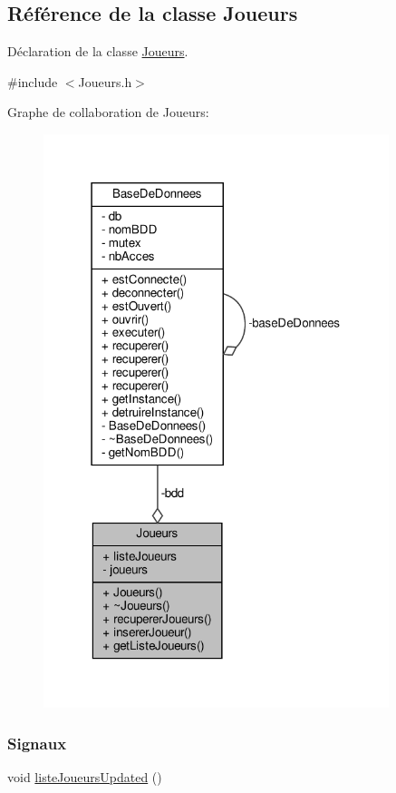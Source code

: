 \hypertarget{class_joueurs}{}\subsection{Référence de la classe Joueurs}
\label{class_joueurs}


Déclaration de la classe \hyperlink{class_joueurs}{Joueurs}.  




{\ttfamily \#include $<$Joueurs.\+h$>$}



Graphe de collaboration de Joueurs\+:\nopagebreak
\begin{figure}[H]
\begin{center}
\leavevmode
\includegraphics[width=286pt]{class_joueurs__coll__graph}
\end{center}
\end{figure}
\subsubsection*{Signaux}
\begin{DoxyCompactItemize}
\item 
void \hyperlink{class_joueurs_a5df3ead7bec2c66c600ec53880afe035}{liste\+Joueurs\+Updated} ()
\end{DoxyCompactItemize}
